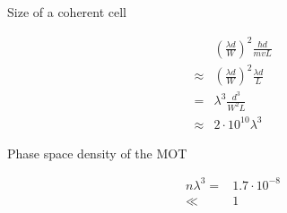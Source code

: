\documentclass[10pt,fleqn]{article}
\newcommand{\eqar}[1]
{
  \begin{align*}
    #1
  \end{align*}
}
\newcommand{\paren}[1]{{\left({#1}\right)}}
\begin{document}
\subsection{}
Size of a coherent cell
\eqar{
  &\paren{\frac{\lambda d}{W}}^2\frac{\hbar d}{mvL}\\
  \approx&\paren{\frac{\lambda d}{W}}^2\frac{\lambda d}{L}\\
  =&\lambda^3\frac{d^3}{W^2L}\\
  \approx&2\cdot10^{10}\lambda^3
}
Phase space density of the MOT
\eqar{
  n\lambda^3=&1.7\cdot10^{-8}\\
  \ll&1
}
\end{document}
